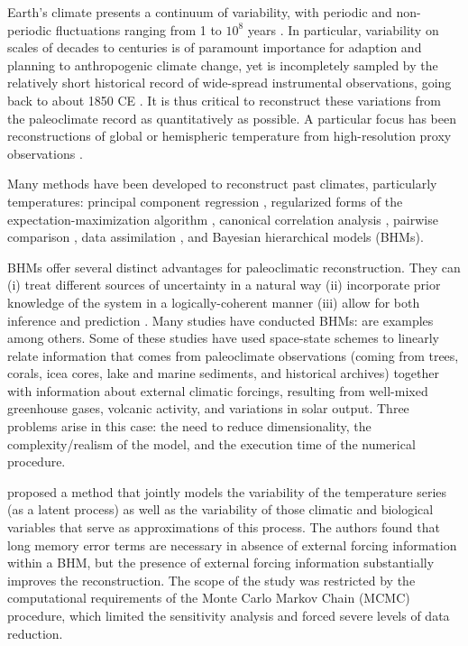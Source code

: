 \documentclass[12pt]{amsart}
\theoremstyle{plain}
\theoremstyle{definition}
\theoremstyle{remark}
\begin{document}
Earth's climate presents a continuum of variability, with periodic and non-periodic fluctuations ranging from 1 to $10^8$ years \citep{pelletier_power_1998,ghil2002natural,huybers_links_2006}. In particular, variability on scales of decades to centuries is of paramount importance for adaption and planning to anthropogenic climate change, yet is incompletely sampled by the relatively short historical record of wide-spread instrumental observations, going back to about 1850 CE \citep{AR5_chap5}. It is thus critical to reconstruct these variations from the paleoclimate record as quantitatively as possible.  A particular focus has been reconstructions of global or hemispheric temperature from high-resolution proxy observations \citep{Jones_Holocene09}.

Many methods have been developed to reconstruct past climates, particularly temperatures:  principal component regression
\citep{MBH98,MBH99,luterbacher2004european,Wahl2012,Neukom:2014}, regularized forms of the expectation-maximization algorithm \citep{Schneider2001,bradley2005proxy,mann2005testing,mann2007robust,rutherford2003climate,steig2009,JEG10a,JEG10b,Guillot_AOAS2015}, canonical
correlation analysis \citep{smerdon2010pseudoproxy,Wang_CP2014,Evans_grl2014}, pairwise comparison
\citep{Hanhijarvi2013,Gergis2016}, data assimilation \citep{Lee_CD08,Hakim2016}, and Bayesian hierarchical models (BHMs). 

BHMs offer several distinct advantages for paleoclimatic reconstruction. They can (i) treat different sources of uncertainty in a natural way (ii) incorporate prior knowledge of the system in a logically-coherent manner \citep{Jaynes04} (iii) allow for both inference and prediction \citep{Tingley_QSR2012}. 
Many studies have conducted BHMs: \cite{boli1, tingley1,tingley2,tingley2013_Ext,werner2012pseudoproxy,Barboza2014} are examples among others. Some of these studies have used space-state
schemes to linearly relate information that comes from paleoclimate observations (coming from trees, corals, icea cores, lake and marine sediments, and historical archives) together with information about external climatic forcings, resulting from 
well-mixed greenhouse gases, volcanic activity, and variations in solar output.   Three problems arise in this
case: the need to reduce dimensionality, the complexity/realism of the model, and the execution time of the numerical procedure. 

\citet{Barboza2014} proposed a method that jointly models the variability of the
temperature series (as a latent process) as well as the variability of those
climatic and biological variables that serve as approximations of this process.
The authors found that long memory error terms are necessary in absence of
external forcing information within a BHM, but the
presence of external forcing information substantially improves the reconstruction. The scope of the study was restricted by the computational requirements of the Monte Carlo Markov Chain (MCMC) procedure, which limited the sensitivity analysis and forced severe levels of data reduction. 
\end{document}
